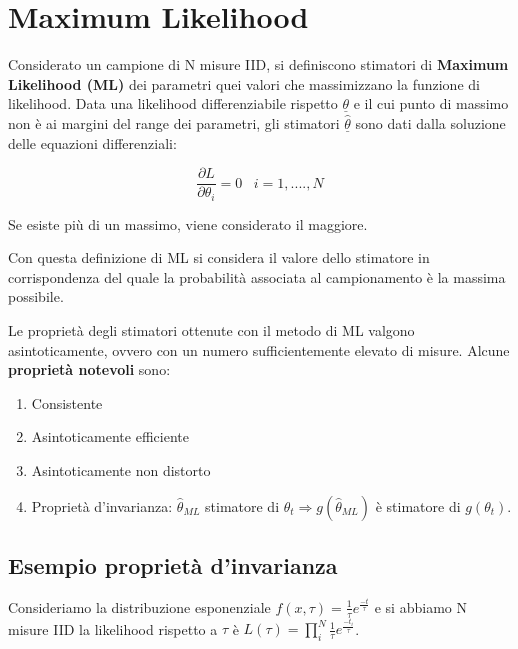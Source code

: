 \section{Maximum Likelihood}

Considerato un campione di N misure IID, si definiscono stimatori di \textbf{Maximum Likelihood (ML)} dei parametri quei valori che massimizzano la funzione di likelihood. Data una likelihood differenziabile rispetto $\underline{\theta}$ e il cui punto di massimo non \`{e} ai margini del range dei parametri, gli stimatori $\underline{\hat{\theta}}$ sono dati dalla soluzione delle equazioni differenziali:

\begin{equation}
\frac{\partial L}{\partial \theta_{i}}=0 \;\;\; i = 1,....,N
\end{equation}

\noindent Se esiste pi\`{u} di un massimo, viene considerato il maggiore. \newline

\noindent Con questa definizione di ML si considera il valore dello stimatore in corrispondenza del quale la probabilit\`{a} associata al campionamento \`{e} la massima possibile.

\noindent Le propriet\`{a} degli stimatori ottenute con il metodo di ML valgono asintoticamente, ovvero con un numero sufficientemente elevato di misure. Alcune \textbf{propriet\`{a} notevoli} sono:

\begin{enumerate}
	\item Consistente
	\item Asintoticamente efficiente
	\item Asintoticamente non distorto
	\item Propriet\`{a} d'invarianza: $\hat{\theta}_{ML}$ stimatore di $\theta_{t} \Rightarrow g(\hat{\theta}_{ML})$ \`{e} stimatore di $g(\theta_{t})$.
\end{enumerate}

\subsection*{Esempio propriet\`{a} d'invarianza}

Consideriamo la distribuzione esponenziale $f(x,\tau) = \frac{1}{\tau}e^{\frac{-t}{\tau}}$ e si abbiamo N misure IID la likelihood rispetto a $\tau$ \`{e} $L(\tau) = \prod_{i}^N \frac{1}{\tau}e^{\frac{-t_{i}}{\tau}}$.
\newline

